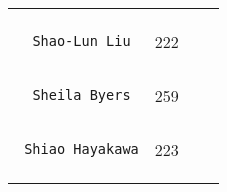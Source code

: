 \documentclass[]{article}
\begin{document}
\begin{longtable}[c]{@{}llll@{}}
\begin{minipage}[t]{0.13\columnwidth}
\end{minipage} & \begin{minipage}[t]{0.15\columnwidth}\raggedright
\end{minipage}
\\\noalign{\medskip}
\begin{minipage}[t]{0.39\columnwidth}\raggedright
\begin{verbatim}
  Shao-Lun Liu
\end{verbatim}
\end{minipage} & \begin{minipage}[t]{0.10\columnwidth}\raggedright
222
\end{minipage} & \begin{minipage}[t]{0.13\columnwidth}\raggedright
\end{minipage} & \begin{minipage}[t]{0.15\columnwidth}\raggedright
\end{minipage}
\\\noalign{\medskip}
\begin{minipage}[t]{0.39\columnwidth}\raggedright
\begin{verbatim}
  Sheila Byers
\end{verbatim}
\end{minipage} & \begin{minipage}[t]{0.10\columnwidth}\raggedright
259
\end{minipage} & \begin{minipage}[t]{0.13\columnwidth}\raggedright
\end{minipage} & \begin{minipage}[t]{0.15\columnwidth}\raggedright
\end{minipage}
\\\noalign{\medskip}
\begin{minipage}[t]{0.39\columnwidth}\raggedright
\begin{verbatim}
 Shiao Hayakawa
\end{verbatim}
\end{minipage} & \begin{minipage}[t]{0.10\columnwidth}\raggedright
223
\end{minipage} & \begin{minipage}[t]{0.13\columnwidth}\raggedright
\end{minipage} & \begin{minipage}[t]{0.15\columnwidth}\raggedright
\end{minipage}
\\\noalign{\medskip}
\begin{minipage}[t]{0.39\columnwidth}\raggedright

\end{minipage}
\end{longtable}
\end{document}
